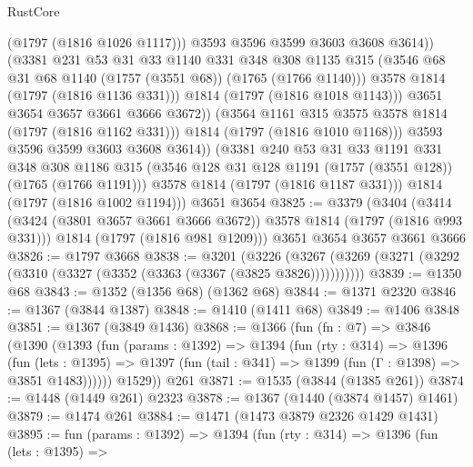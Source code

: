 \begin{lexlean}{RustCore}
\begin{coremodule}
                        (@1797 (@1816 @1026 @1117)))
                      @3593
                      @3596
                      @3599
                      @3603
                      @3608
                      @3614))
                  (@3381
                    @231
                    @53
                    @31
                    @33
                    @1140
                    @331
                    @348
                    @308
                    @1135
                    @315
                    (@3546 @68 @31 @68 @1140 (@1757 (@3551 @68)) (@1765 (@1766 @1140)))
                    @3578
                    @1814
                    (@1797 (@1816 @1136 @331)))
                  @1814
                  (@1797 (@1816 @1018 @1143)))
                @3651
                @3654
                @3657
                @3661
                @3666
                @3672))
            (@3564 @1161 @315 @3575 @3578 @1814 (@1797 (@1816 @1162 @331)))
            @1814
            (@1797 (@1816 @1010 @1168)))
          @3593
          @3596
          @3599
          @3603
          @3608
          @3614))
      (@3381
        @240
        @53
        @31
        @33
        @1191
        @331
        @348
        @308
        @1186
        @315
        (@3546 @128 @31 @128 @1191 (@1757 (@3551 @128)) (@1765 (@1766 @1191)))
        @3578
        @1814
        (@1797 (@1816 @1187 @331)))
      @1814
      (@1797 (@1816 @1002 @1194)))
    @3651
    @3654
@3825 := @3379
    (@3404
      (@3414 (@3424 (@3801 @3657 @3661 @3666 @3672)) @3578 @1814 (@1797 (@1816 @993 @331)))
      @1814
      (@1797 (@1816 @981 @1209)))
    @3651
    @3654
    @3657
    @3661
    @3666
@3826 := @1797 @3668
@3838 := @3201
    (@3226 (@3267 (@3269 (@3271 (@3292 (@3310 (@3327 (@3352 (@3363 (@3367 (@3825 @3826)))))))))))
@3839 := @1350 @68
@3843 := @1352 (@1356 @68) (@1362 @68)
@3844 := @1371 @2320
@3846 := @1367 (@3844 @1387)
@3848 := @1410 (@1411 @68)
@3849 := @1406 @3848
@3851 := @1367 (@3849 @1436)
@3868 := @1366
    (fun (fn : @7) =>
    @3846
      (@1390
        (@1393
          (fun (params : @1392) =>
          @1394
            (fun (rty : @314) =>
            @1396
              (fun (lets : @1395) =>
              @1397 (fun (tail : @341) => @1399 (fun (Γ : @1398) => @3851 @1483))))))
        @1529))
    @261
@3871 := @1535 (@3844 (@1385 @261))
@3874 := @1448 (@1449 @261) @2323
@3878 := @1367 (@1440 (@3874 @1457) @1461)
@3879 := @1474 @261
@3884 := @1471 (@1473 @3879 @2326 @1429 @1431)
@3895 := fun (params : @1392) =>
  @1394
    (fun (rty : @314) =>
    @1396
      (fun (lets : @1395) =>

\end{coremodule}
\end{lexlean}
